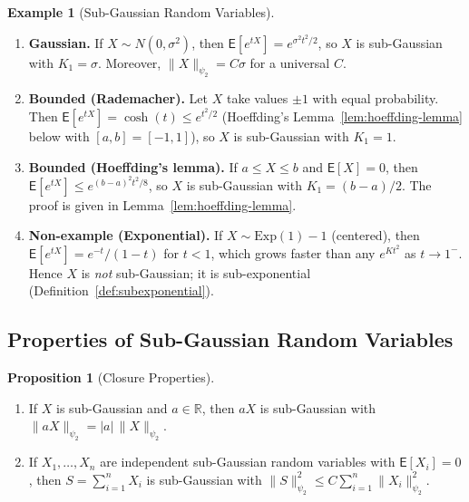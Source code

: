 \documentclass[12pt,a4paper]{article}
\theoremstyle{definition}
\newtheorem{example}[theorem]{Example}
\newtheorem{proposition}[theorem]{Proposition}
\newcommand\expc{\mathsf{E}}
\newcommand{\Real}{\mathbb{R}}
\begin{document}
\begin{example}[Sub-Gaussian Random Variables]\label{ex:subgaussian}
\leavevmode
\begin{enumerate}[label=\textup{(\arabic*)}]
\item \textbf{Gaussian.} If $X \sim N(0, \sigma^2)$, then $\expc[e^{tX}] = e^{\sigma^2 t^2/2}$, so $X$ is sub-Gaussian with $K_1 = \sigma$. Moreover, $\|X\|_{\psi_2} = C\sigma$ for a universal $C$.

\item \textbf{Bounded (Rademacher).} Let $X$ take values $\pm 1$ with equal probability. Then $\expc[e^{tX}] = \cosh(t) \leqslant e^{t^2/2}$ (Hoeffding's Lemma~\ref{lem:hoeffding-lemma} below with $[a,b] = [-1,1]$), so $X$ is sub-Gaussian with $K_1 = 1$.

\item \textbf{Bounded (Hoeffding's lemma).} If $a \leqslant X \leqslant b$ and $\expc[X] = 0$, then $\expc[e^{tX}] \leqslant e^{(b-a)^2t^2/8}$, so $X$ is sub-Gaussian with $K_1 = (b-a)/2$. The proof is given in Lemma~\ref{lem:hoeffding-lemma}.

\item \textbf{Non-example (Exponential).} If $X \sim \mathrm{Exp}(1) - 1$ (centered), then $\expc[e^{tX}] = e^{-t}/(1-t)$ for $t < 1$, which grows faster than any $e^{Kt^2}$ as $t \to 1^-$. Hence $X$ is \emph{not} sub-Gaussian; it is sub-exponential (Definition~\ref{def:subexponential}).
\end{enumerate}
\end{example}

\subsection{Properties of Sub-Gaussian Random Variables}

\begin{proposition}[Closure Properties]\label{prop:sg-closure}
\leavevmode
\begin{enumerate}[label=\textup{(\roman*)}]
\item If $X$ is sub-Gaussian and $a \in \Real$, then $aX$ is sub-Gaussian with $\|aX\|_{\psi_2} = |a|\,\|X\|_{\psi_2}$.
\item If $X_1, \ldots, X_n$ are independent sub-Gaussian random variables with $\expc[X_i] = 0$, then $S = \sum_{i=1}^n X_i$ is sub-Gaussian with $\|S\|_{\psi_2}^2 \leqslant C\sum_{i=1}^n \|X_i\|_{\psi_2}^2$.
\end{enumerate}
\end{proposition}
\end{document}
